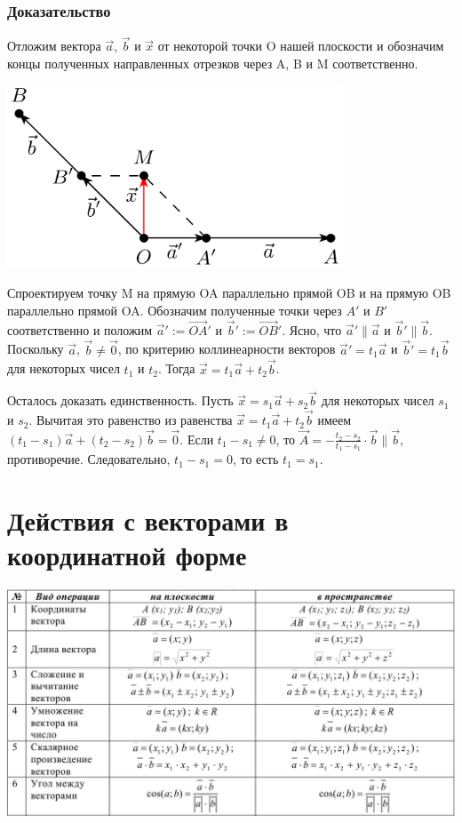 \documentclass[a4paper]{article}
\begin{document}
\subsubsection*{Доказательство}
Отложим вектора $\vec{a}$, $\vec{b}$ и $\vec{x}$ от некоторой точки O нашей
плоскости и обозначим концы полученных направленных отрезков через A, B и M соответственно.

\includegraphics[width=10cm]{t1}

Спроектируем точку M на прямую OA параллельно прямой OB и на прямую OB параллельно прямой OA. Обозначим полученные точки через $A'$ и $B'$ соответственно и положим  $\vec{a}' := \overrightarrow{OA}'$ и $\vec{b}' := \overrightarrow{OB}'$. Ясно, что $\vec{a}' \parallel \vec{a}$ и $\vec{b}' \parallel \vec{b}$. Поскольку $\vec{a}$, $\vec{b} \neq \vec{0}$, по критерию коллинеарности векторов $\vec{a}' = t_1 \vec{a}$ и $\vec{b}' = t_1 \vec{b}$ для некоторых чисел $t_1$ и $t_2$.
Тогда $\vec{x} = t_1 \vec{a} + t_2 \vec{b}$.

Осталось доказать единственность. Пусть $\vec{x} = s_1 \vec{a} + s_2 \vec{b}$ для некоторых  чисел $s_1$ и $s_2$. Вычитая это равенство из равенства $\vec{x} = t_1 \vec{a} + t_2 \vec{b}$ имеем $(t_1 - s_1) \vec{a} + (t_2 - s_2) \vec{b} = \vec{0}$. Если $t_1-s_1 \neq 0$, то $\displaystyle \vec{A} = - \frac{t_2 - s_2}{t_1 - s_1} \cdot \vec{b} \parallel \vec{b}$, противоречие. Следовательно, $t_1 - s_1 = 0$, то есть $t_1 = s_1$. 

\section*{Действия с векторами в координатной форме}

\includegraphics[width=18cm]{t2}
\end{document}
